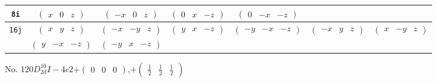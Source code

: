 \documentclass[fleqn,9pt,landscape]{jsarticle}
\begin{document}
\begin{center}
\begin{longtable}{ccccccc}
{\tt 8i} & $ \begin{pmatrix} x & 0 & z \end{pmatrix} $ & $ \begin{pmatrix} - x & 0 & z \end{pmatrix} $ & $ \begin{pmatrix} 0 & x & - z \end{pmatrix} $ & $ \begin{pmatrix} 0 & - x & - z \end{pmatrix} $ & $  $ & $  $ \\ \hline
{\tt 16j} & $ \begin{pmatrix} x & y & z \end{pmatrix} $ & $ \begin{pmatrix} - x & - y & z \end{pmatrix} $ & $ \begin{pmatrix} y & x & - z \end{pmatrix} $ & $ \begin{pmatrix} - y & - x & - z \end{pmatrix} $ & $ \begin{pmatrix} - x & y & z \end{pmatrix} $ & $ \begin{pmatrix} x & - y & z \end{pmatrix} $ \\
& $ \begin{pmatrix} y & - x & - z \end{pmatrix} $ & $ \begin{pmatrix} - y & x & - z \end{pmatrix} $ & $  $ & $  $ & $  $ & $  $ \\
\end{longtable}
\end{center}
\newpage
No. 120\quad$D_{2d}^{10}$\quad$I-4c2$\quad[ tetragonal ]\quad$+\begin{pmatrix} 0 & 0 & 0 \end{pmatrix}$,\quad $+\begin{pmatrix} \frac{1}{2} & \frac{1}{2} & \frac{1}{2} \end{pmatrix}$
\end{document}
